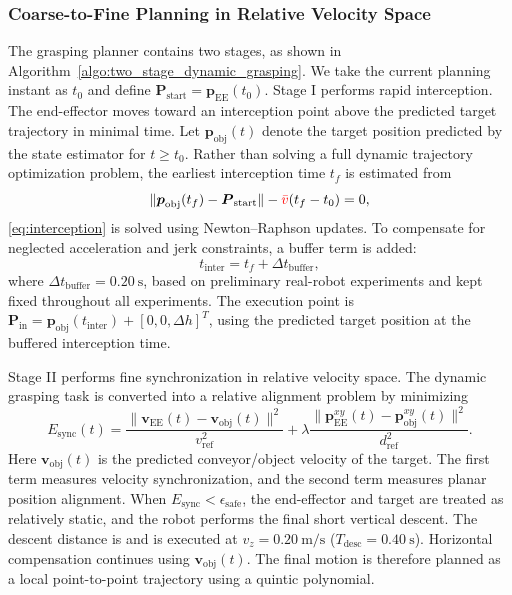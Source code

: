 \subsubsection{Coarse-to-Fine Planning in Relative Velocity Space}
The grasping planner contains two stages, as shown in Algorithm~\ref{algo:two_stage_dynamic_grasping}. We take the current planning instant as $t_0$ and define $\boldsymbol{P}_{\text{start}}=\boldsymbol{p}_{\text{EE}}(t_0)$. Stage I performs rapid interception. The end-effector moves toward an interception point above the predicted target trajectory in minimal time. Let $\boldsymbol{p}_{\text{obj}}(t)$ denote the target position predicted by the state estimator for $t\ge t_0$. Rather than solving a full dynamic trajectory optimization problem, the earliest interception time $t_f$ is estimated from
\begin{equation}
\|\boldsymbol{p}_{\text{obj}}(t_f)-\boldsymbol{P}_{\text{start}}\|-{\color{red}\bar v}(t_f-t_0)=0,
\label{eq:interception}
\end{equation}
\eqref{eq:interception} is solved using Newton--Raphson updates. To compensate for neglected acceleration and jerk constraints, a buffer term is added:
\begin{equation}
t_{\text{inter}}=t_f+\Delta t_{\text{buffer}},
\label{equ:estimate}
\end{equation}
where $\Delta t_{\text{buffer}}=0.20~\mathrm{s}$, based on preliminary real-robot experiments and kept fixed throughout all experiments. The execution point is $\boldsymbol{P}_{\text{in}}=\boldsymbol{p}_{\text{obj}}(t_{\text{inter}})+[0,0,\Delta h]^T$, using the predicted target position at the buffered interception time.

Stage II performs fine synchronization in relative velocity space. The dynamic grasping task is converted into a relative alignment problem by minimizing
\begin{equation}
E_{\text{sync}}(t)=\frac{\|\boldsymbol{v}_{\text{EE}}(t)-\boldsymbol{v}_{\text{obj}}(t)\|^2}{v_{\text{ref}}^{2}}+
\lambda\frac{\|\boldsymbol{p}_{\text{EE}}^{xy}(t)-\boldsymbol{p}_{\text{obj}}^{xy}(t)\|^2}{d_{\text{ref}}^{2}}.
\label{eq:sync}
\end{equation}
Here $\boldsymbol{v}_{\text{obj}}(t)$ is the predicted conveyor/object velocity of the target. The first term measures velocity synchronization, and the second term measures planar position alignment. When $E_{\text{sync}}<\epsilon_{\text{safe}}$, the end-effector and target are treated as relatively static, and the robot performs the final short vertical descent. The descent distance is  and is executed at $v_z=0.20~\mathrm{m/s}$ ($T_{\text{desc}}=0.40~\mathrm{s}$). Horizontal compensation continues using $\boldsymbol{v}_{\text{obj}}(t)$. The final motion is therefore planned as a local point-to-point trajectory using a quintic polynomial.

